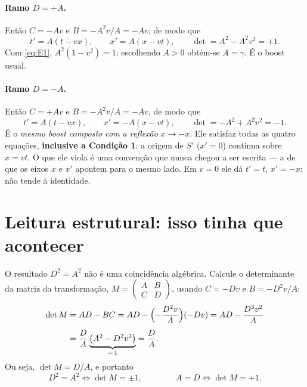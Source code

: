 \documentclass[12pt,a4paper,oneside]{book}
\begin{document}
\paragraph{Ramo $D=+A$.} Então $C=-Av$ e $B=-A^2v/A=-Av$, de modo que
\begin{equation}
  t' = A(t-vx), \qquad x' = A(x-vt),
  \qquad \det = A^2 - A^2v^2 = +1 .
\end{equation}
Com \eqref{eq:E1}, $A^2(1-v^2)=1$; escolhendo $A>0$ obtém-se $A=\gamma$. É o
boost usual.

\paragraph{Ramo $D=-A$.} Então $C=+Av$ e $B=-A^2v/A=-Av$, de modo que
\begin{equation}
  t' = A(t-vx), \qquad x' = -A(x-vt),
  \qquad \det = -A^2 + A^2v^2 = -1 .
\end{equation}
É o \emph{mesmo boost composto com a reflexão} $x\to-x$. Ele satisfaz todas
as quatro equações, \textbf{inclusive a Condição 1}: a origem de $S'$
($x'=0$) continua sobre $x=vt$. O que ele viola é uma convenção que nunca
chegou a ser escrita --- a de que os eixos $x$ e $x'$ apontem para o mesmo
lado. Em $v=0$ ele dá $t'=t$, $x'=-x$: não tende à identidade.

\section{Leitura estrutural: isso tinha que acontecer}

O resultado $D^2=A^2$ não é uma coincidência algébrica. Calcule o
determinante da matriz da transformação,
$M=\begin{pmatrix} A & B\\ C & D\end{pmatrix}$, usando $C=-Dv$ e
$B=-D^2v/A$:
\begin{align}
  \det M &= AD - BC
         = AD - \Bigl(-\frac{D^2v}{A}\Bigr)(-Dv)
         = AD - \frac{D^3v^2}{A} \notag\\[4pt]
         &= \frac{D}{A}\underbrace{\bigl(A^2-D^2v^2\bigr)}_{=\,1}
         = \frac{D}{A}.
\end{align}
Ou seja, $\det M = D/A$, e portanto
\begin{equation}
  D^2=A^2 \iff \det M = \pm1,
  \qquad\qquad
  A = D \iff \det M = +1 .
\end{equation}
\end{document}
